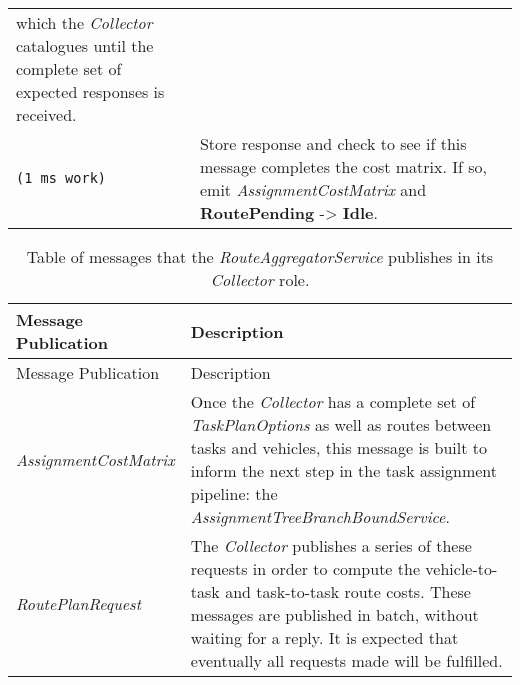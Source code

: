 \begin{longtable}[c]{@{}ll@{}}
\begin{minipage}[t]{0.65\columnwidth}
which the \emph{Collector} catalogues until the complete set of expected
responses is received.
\strut\end{minipage}\tabularnewline
\begin{minipage}[t]{0.29\columnwidth}\raggedright\strut
\begin{verbatim}
(1 ms work)
\end{verbatim}
\strut\end{minipage} &
\begin{minipage}[t]{0.65\columnwidth}\raggedright\strut
Store response and check to see if this message completes the cost
matrix. If so, emit \emph{AssignmentCostMatrix} and
\textbf{RoutePending} -\textgreater{} \textbf{Idle}.
\strut\end{minipage}\tabularnewline
\bottomrule
\end{longtable}

\begin{longtable}[c]{@{}ll@{}}
\caption{Table of messages that the \emph{RouteAggregatorService}
publishes in its \emph{Collector} role.}\tabularnewline
\toprule
\begin{minipage}[b]{0.29\columnwidth}\raggedright\strut
Message Publication
\strut\end{minipage} &
\begin{minipage}[b]{0.65\columnwidth}\raggedright\strut
Description
\strut\end{minipage}\tabularnewline
\midrule
\endfirsthead
\toprule
\begin{minipage}[b]{0.29\columnwidth}\raggedright\strut
Message Publication
\strut\end{minipage} &
\begin{minipage}[b]{0.65\columnwidth}\raggedright\strut
Description
\strut\end{minipage}\tabularnewline
\midrule
\endhead
\begin{minipage}[t]{0.29\columnwidth}\raggedright\strut
\emph{AssignmentCostMatrix}
\strut\end{minipage} &
\begin{minipage}[t]{0.65\columnwidth}\raggedright\strut
Once the \emph{Collector} has a complete set of \emph{TaskPlanOptions}
as well as routes between tasks and vehicles, this message is built to
inform the next step in the task assignment pipeline: the
\emph{AssignmentTreeBranchBoundService}.
\strut\end{minipage}\tabularnewline
\begin{minipage}[t]{0.29\columnwidth}\raggedright\strut
\emph{RoutePlanRequest}
\strut\end{minipage} &
\begin{minipage}[t]{0.65\columnwidth}\raggedright\strut
The \emph{Collector} publishes a series of these requests in order to
compute the vehicle-to-task and task-to-task route costs. These messages
are published in batch, without waiting for a reply. It is expected that
eventually all requests made will be fulfilled.
\strut\end{minipage}\tabularnewline
\bottomrule
\end{longtable}

